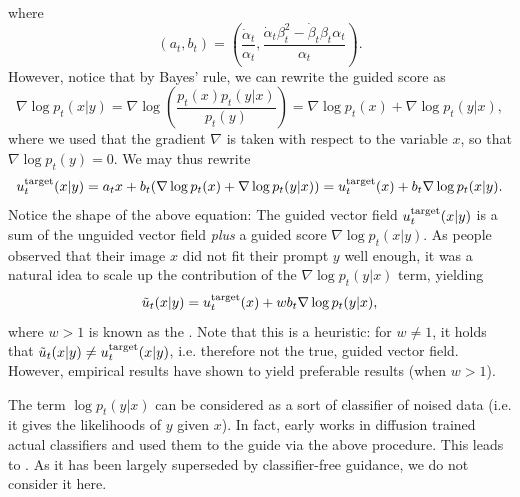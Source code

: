 where 
\begin{equation}
   (a_t, b_t) = \left(\frac{\dot{\alpha}_t}{\alpha_t}, \frac{\dot{\alpha}_t \beta_t^2-\dot{\beta}_t \beta_t \alpha_t}{\alpha_t}\right). 
\end{equation}
However, notice that by Bayes' rule, we can rewrite the guided score as
\begin{equation}
   \nabla \log p_t(x|y) = \nabla \log \left(\frac{p_t(x)p_t(y|x)}{p_t(y)}\right) = \nabla \log p_t(x) + \nabla \log p_t(y|x), 
   \label{eq:bayes_rule}
\end{equation}
where we used that the gradient $\nabla$ is taken with respect to the variable $x$, so that $\nabla \log p_t(y) = 0$. We may thus rewrite 
\begin{align*}
    u^{\text{target}}_t(x|y) = a_tx + b_t(\nabla \log p_t(x) + \nabla \log p_t(y|x)) = u^{\text{target}}_t(x) + b_t \nabla \log p_t(x|y).
\end{align*}
Notice the shape of the above equation: The guided vector field $u^{\text{target}}_t(x|y)$ is a sum of the unguided vector field \emph{plus} a guided score $\nabla\log p_t(x|y)$. As people observed that their image $x$ did not fit their prompt $y$ well enough, it was a natural idea to scale up the contribution of the $\nabla \log p_t(y|x)$ term, yielding
\begin{align*}
    \tilde{u}_t(x|y) = u^{\text{target}}_t(x) + w b_t \nabla \log p_t(y|x),
\end{align*}
where $w > 1$ is known as the . Note that this is a heuristic: for $w \neq 1$, it holds that $\tilde{u}_t(x|y) \neq u^{\text{target}}_t(x|y)$, i.e. therefore not the true, guided vector field. However, empirical results have shown to yield preferable results (when $w > 1$). 
\begin{remarkbox}
The term $\log p_t(y|x)$ can be considered as a sort of classifier of noised data (i.e. it gives the likelihoods of $y$ given $x$). In fact, early works in diffusion trained actual classifiers and used them to the guide via the above procedure. This leads to  \cite{classifier_guidance, yangsong_sde}. As it has been largely superseded by classifier-free guidance, we do not consider it here. 
\end{remarkbox}

